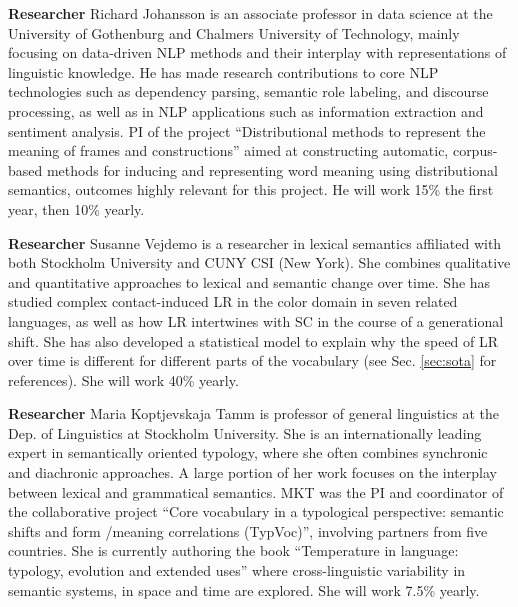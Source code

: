 \documentclass[12pt,twoside,a4paper]{article}
\begin{document}
	\textbf{Researcher} Richard Johansson is an associate professor in data science at the University of Gothenburg and Chalmers University of Technology, mainly focusing on data-driven NLP methods and their interplay with representations of linguistic knowledge. He has made research contributions to core NLP technologies such as dependency parsing, semantic role labeling, and discourse processing, as well as in NLP applications such as information extraction and sentiment analysis. PI of the project “Distributional methods to represent the meaning of frames and constructions” aimed at constructing automatic, corpus-based methods for inducing and representing word meaning using distributional semantics, outcomes highly relevant for this project. He will work 15\% the first year, then 10\% yearly.
	
	\textbf{Researcher} Susanne Vejdemo is a researcher in lexical semantics affiliated with both Stockholm University and CUNY CSI (New York). She combines qualitative and quantitative approaches to lexical and semantic change over time. She has studied complex contact-induced LR in the color domain in seven related languages, as well as how LR intertwines with SC in the course of a generational shift. She has also developed a statistical model to explain why the speed of LR over time is different for different parts of the vocabulary (see Sec. \ref{sec:sota} for references). She will work 40\% yearly. 
	
	\textbf{Researcher} Maria Koptjevskaja Tamm is professor of general linguistics at the Dep. of Linguistics at Stockholm University. She is an internationally leading expert in semantically oriented typology, where she often combines synchronic and diachronic approaches. A large portion of her work focuses on the interplay between lexical and grammatical semantics. MKT was the PI and coordinator of the collaborative project “Core vocabulary in a typological perspective: semantic shifts and form /meaning correlations (TypVoc)”, involving partners from five countries. She is currently authoring the book “Temperature in language: typology, evolution and extended uses” where cross-linguistic variability in semantic systems, in space and time are explored. She will work 7.5\% yearly. 
	
\end{document}
